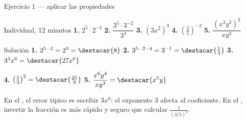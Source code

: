 \documentclass[aspectratio=169,10pt]{beamer}
\begin{document}
\begin{frame}{Ejercicio 1 — aplicar las propiedades}
  \scriptsize
  \begin{alertblock}{Individual, 12 minutos}
    \tiny
    \textbf{1.} $2^{5}\cdot 2^{-2}$ \qquad
    \textbf{2.} $\dfrac{3^{5}\cdot 3^{-2}}{3^{4}}$ \qquad
    \textbf{3.} $(3x^{2})^{3}$ \qquad
    \textbf{4.} $\left(\tfrac{3}{5}\right)^{-2}$ \qquad
    \textbf{5.} $\dfrac{(x^{3}y^{2})^{2}}{xy^{3}}$
  \end{alertblock}

  \vspace{0.05cm}
  \begin{block}{Solución}
    \tiny
    \textbf{1.} $2^{5-2} = 2^{3} = \destacar{8}$ \qquad
    \textbf{2.} $3^{5-2-4} = 3^{-1} = \destacar{\tfrac{1}{3}}$ \qquad
    \textbf{3.} $3^{3}x^{6} = \destacar{27x^{6}}$

    \vspace{0.08cm}
    \textbf{4.} $\left(\tfrac{5}{3}\right)^{2} = \destacar{\tfrac{25}{9}}$
    \qquad
    \textbf{5.} $\dfrac{x^{6}y^{4}}{xy^{3}} = \destacar{x^{5}y}$
  \end{block}

  \vspace{0.05cm}
  {\tiny\color{uniGris} En el , el error típico es escribir
  $3x^{6}$: el exponente $3$ afecta  al coeficiente. En el
  , invertir la fracción es más rápido y seguro que calcular
  $\tfrac{1}{(3/5)^{2}}$.}
\end{frame}
\end{document}
